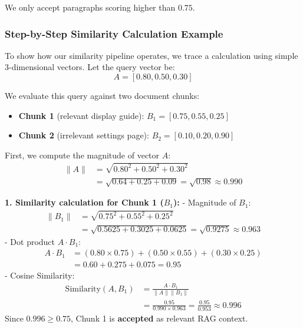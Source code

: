 \documentclass[12pt,a4paper]{report}
\begin{document}
We only accept paragraphs scoring higher than $0.75$.

\subsubsection{Step-by-Step Similarity Calculation Example}

To show how our similarity pipeline operates, we trace a calculation using simple 3-dimensional vectors. Let the query vector be:
\begin{equation}
A = [0.80, 0.50, 0.30]
\end{equation}

We evaluate this query against two document chunks:
\begin{itemize}
    \item \textbf{Chunk 1} (relevant display guide): $B_1 = [0.75, 0.55, 0.25]$
    \item \textbf{Chunk 2} (irrelevant settings page): $B_2 = [0.10, 0.20, 0.90]$
\end{itemize}

First, we compute the magnitude of vector $A$:
\begin{align}
\|A\| &= \sqrt{0.80^2 + 0.50^2 + 0.30^2} \nonumber \\
&= \sqrt{0.64 + 0.25 + 0.09} = \sqrt{0.98} \approx 0.990
\end{align}

\textbf{1. Similarity calculation for Chunk 1 ($B_1$):}
- Magnitude of $B_1$:
\begin{align}
\|B_1\| &= \sqrt{0.75^2 + 0.55^2 + 0.25^2} \nonumber \\
&= \sqrt{0.5625 + 0.3025 + 0.0625} = \sqrt{0.9275} \approx 0.963
\end{align}
- Dot product $A \cdot B_1$:
\begin{align}
A \cdot B_1 &= (0.80 \times 0.75) + (0.50 \times 0.55) + (0.30 \times 0.25) \nonumber \\
&= 0.60 + 0.275 + 0.075 = 0.95
\end{align}
- Cosine Similarity:
\begin{align}
\text{Similarity}(A, B_1) &= \frac{A \cdot B_1}{\|A\| \|B_1\|} \nonumber \\
&= \frac{0.95}{0.990 \times 0.963} = \frac{0.95}{0.953} \approx 0.996
\end{align}
Since $0.996 \ge 0.75$, Chunk 1 is \textbf{accepted} as relevant RAG context.
\end{document}
